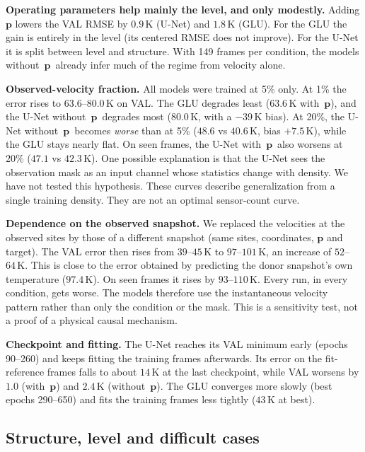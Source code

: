 \documentclass[11pt,letterpaper]{article}
\newcommand{\K}{\,\mathrm{K}}
\newcommand{\pon}{with~$\mathbf{p}$}
\newcommand{\poff}{without~$\mathbf{p}$}
\begin{document}
\textbf{Operating parameters help mainly the level, and only modestly.} Adding $\mathbf{p}$ lowers the VAL RMSE by $0.9\K$ (U-Net) and $1.8\K$ (GLU). For the GLU the gain is entirely in the level (its centered RMSE does not improve). For the U-Net it is split between level and structure. With 149 frames per condition, the models \poff\ already infer much of the regime from velocity alone.

\textbf{Observed-velocity fraction.} All models were trained at 5\% only. At 1\% the error rises to $63.6$--$80.0\K$ on VAL. The GLU degrades least ($63.6\K$ \pon), and the U-Net \poff\ degrades most ($80.0\K$, with a $-39\K$ bias). At 20\%, the U-Net \poff\ becomes \emph{worse} than at 5\% ($48.6$ vs $40.6\K$, bias $+7.5\K$), while the GLU stays nearly flat. On seen frames, the U-Net \pon\ also worsens at 20\% ($47.1$ vs $42.3\K$). One possible explanation is that the U-Net sees the observation mask as an input channel whose statistics change with density. We have not tested this hypothesis. These curves describe generalization from a single training density. They are not an optimal sensor-count curve.

\textbf{Dependence on the observed snapshot.} We replaced the velocities at the observed sites by those of a different snapshot (same sites, coordinates, $\mathbf{p}$ and target). The VAL error then rises from $39$--$45\K$ to $97$--$101\K$, an increase of $52$--$64\K$. This is close to the error obtained by predicting the donor snapshot's own temperature ($97.4\K$). On seen frames it rises by $93$--$110\K$. Every run, in every condition, gets worse. The models therefore use the instantaneous velocity pattern rather than only the condition or the mask. This is a sensitivity test, not a proof of a physical causal mechanism.

\textbf{Checkpoint and fitting.} The U-Net reaches its VAL minimum early (epochs 90--260) and keeps fitting the training frames afterwards. Its error on the fit-reference frames falls to about $14\K$ at the last checkpoint, while VAL worsens by $1.0$ (\pon) and $2.4\K$ (\poff). The GLU converges more slowly (best epochs 290--650) and fits the training frames less tightly ($43\K$ at best).

\subsection{Structure, level and difficult cases}
\label{sec:cases}
\end{document}
